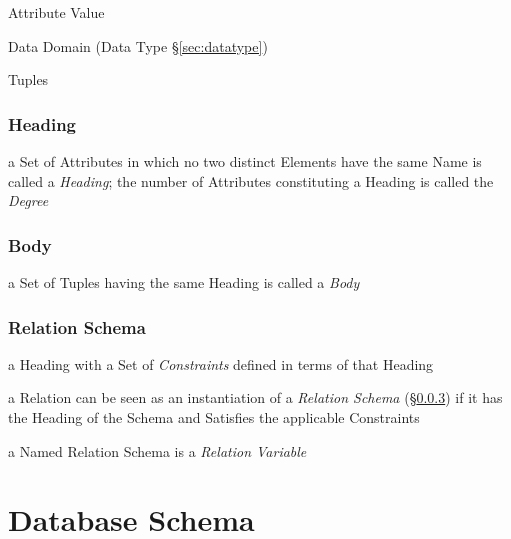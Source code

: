 Attribute Value

Data Domain (Data Type \S\ref{sec:datatype})

Tuples



\subsubsection{Heading}\label{sec:heading}

a Set of Attributes in which no two distinct Elements have the same Name is
called a \emph{Heading}; the number of Attributes constituting a Heading is
called the \emph{Degree}



\subsubsection{Body}\label{sec:body}

a Set of Tuples having the same Heading is called a \emph{Body}



\subsubsection{Relation Schema}\label{sec:relation_schema}

a Heading with a Set of \emph{Constraints} defined in terms of that Heading

a Relation can be seen as an instantiation of a \emph{Relation Schema}
(\S\ref{sec:relation_schema}) if it has the Heading of the Schema and Satisfies
the applicable Constraints

a Named Relation Schema is a \emph{Relation Variable}



\section{Database Schema}\label{sec:database_schema}
